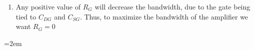 \documentclass[12pt, fleqn]{article}
\begin{document}
\begin{enumerate}[label=(\alph*)]
    \item
    {
    Any positive value of $R_G$ will decrease the bandwidth, due to the gate being tied to $C_{DG}$ and $C_{SG}$.  Thus, to maximize the bandwidth of the amplifier we want $\boxed{R_G = 0}$
    }
\end{enumerate}
\newpage
\appendix

\newpage
{}
\emergencystretch=2em
\nocite{*}
\printbibliography
\end{document}
